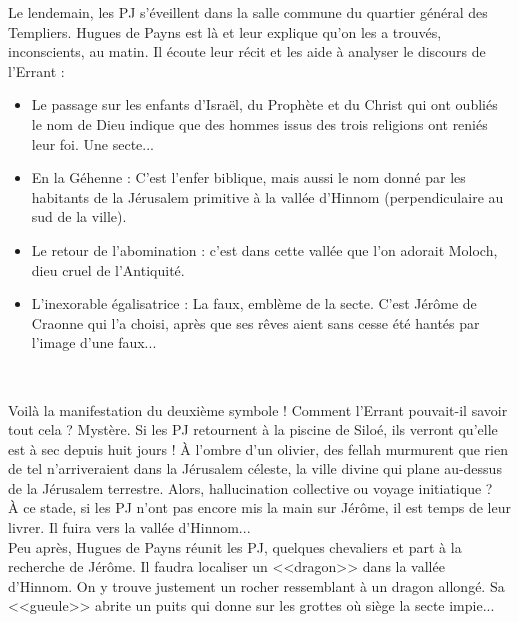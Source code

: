 \documentclass[11pt,twoside,a4paper]{book}
\begin{document}
Le lendemain, les PJ s'{\'e}veillent dans la salle commune du quartier g{\'e}n{\'e}ral des Templiers. Hugues de Payns est l{\`a} et leur explique qu'on les a trouv{\'e}s, inconscients, au matin. Il {\'e}coute leur r{\'e}cit et les aide {\`a} analyser le discours de l'Errant :~\\
\setlength\parindent{20pt}
\begin{itemize}
	\item Le passage sur les enfants d'Isra{\"e}l, du Proph{\`e}te et du Christ qui ont oubli{\'e}s le nom de Dieu indique que des hommes issus des trois religions ont reni{\'e}s leur foi. Une secte...
	\item En la G{\'e}henne : C'est l'enfer biblique, mais aussi le nom donn{\'e} par les habitants de la J{\'e}rusalem primitive {\`a} la vall{\'e}e d'Hinnom (perpendiculaire au sud de la ville).
	\item Le retour de l'abomination : c'est dans cette vall{\'e}e que l'on adorait Moloch, dieu cruel de l'Antiquit{\'e}.
	\item L'inexorable {\'e}galisatrice : La faux, embl{\`e}me de la secte. C'est J{\'e}r{\^o}me de Craonne qui l'a choisi, apr{\`e}s que ses r{\^e}ves aient sans cesse {\'e}t{\'e} hant{\'e}s par l'image d'une faux...
\end{itemize}~\\
\setlength\parindent{0pt}

Voil{\`a} la manifestation du deuxi{\`e}me symbole ! Comment l'Errant pouvait-il savoir tout cela ? Myst{\`e}re. Si les PJ retournent {\`a} la piscine de Silo{\'e}, ils verront qu'elle est {\`a} sec depuis huit jours ! {\`A} l'ombre d'un olivier, des fellah murmurent que rien de tel n'arriveraient dans la J{\'e}rusalem c{\'e}leste, la ville divine qui plane au-dessus de la J{\'e}rusalem terrestre. Alors, hallucination collective ou voyage initiatique ?~\\

{\`A} ce stade, si les PJ n'ont pas encore mis la main sur J{\'e}r{\^o}me, il est temps de leur livrer. Il fuira vers la vall{\'e}e d'Hinnom...~\\

Peu apr{\`e}s, Hugues de Payns r{\'e}unit les PJ, quelques chevaliers et part {\`a} la recherche de J{\'e}r{\^o}me. Il faudra localiser un <<dragon>> dans la vall{\'e}e d'Hinnom. On y trouve justement un rocher ressemblant {\`a} un dragon allong{\'e}. Sa <<gueule>> abrite un puits qui donne sur les grottes o{\`u} si{\`e}ge la secte impie...~\\
\end{document}
